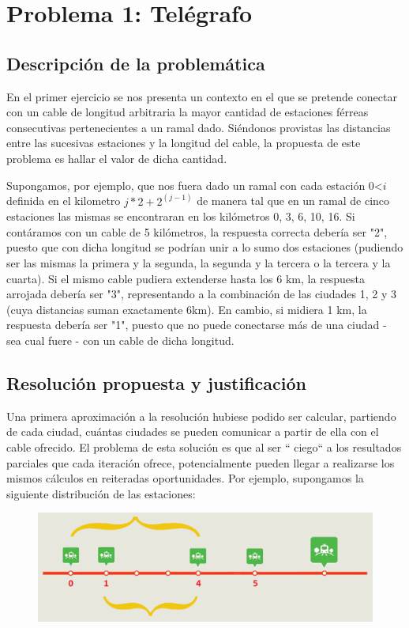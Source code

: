 \section{Problema 1: Tel\'egrafo}

\subsection{Descripci\'on de la problem\'atica}

En el primer ejercicio se nos presenta un contexto en el que se pretende conectar con un cable de longitud arbitraria la mayor cantidad de estaciones férreas consecutivas pertenecientes a un ramal dado. 
Siéndonos provistas las distancias entre las sucesivas estaciones y la longitud del cable, la propuesta de este problema es hallar el valor de dicha cantidad.

Supongamos, por ejemplo, que nos fuera dado un ramal con cada estación  0<$i$ definida en el kilometro $j*2+2^(j-1)$ de manera tal que en un ramal de cinco estaciones las mismas se encontraran en los kilómetros 0, 3, 6, 10, 16.
Si contáramos con un cable de 5 kilómetros, la respuesta correcta debería ser "2", puesto que con dicha longitud se podrían unir a lo sumo dos estaciones (pudiendo ser las mismas la primera y la segunda, la segunda y la tercera o la tercera y la cuarta).
Si el mismo cable pudiera extenderse hasta los 6 km, la respuesta arrojada debería ser "3", representando a la combinación de las ciudades 1, 2 y 3 (cuya distancias suman exactamente 6km).
En cambio, si midiera 1 km, la respuesta debería ser "1", puesto que no puede conectarse más de una ciudad - sea cual fuere - con un cable de dicha longitud.

\subsection{Resoluci\'on propuesta y justificaci\'on}
Una primera aproximación a la resolución hubiese podido ser calcular, partiendo de cada ciudad, cuántas ciudades se pueden comunicar a partir de ella con el cable ofrecido. El problema de esta solución es que al ser `` ciego`` a los resultados parciales que cada iteración ofrece, potencialmente pueden llegar a realizarse los mismos cálculos en reiteradas oportunidades.
Por ejemplo, supongamos la siguiente distribución de las estaciones:

  \begin{figure}[h!]
   \begin{center}
 	\includegraphics[scale=0.5]{imagenes/ej1/estaciones.png}
	\label{estaciones}
   \end{center}
 \end{figure}

